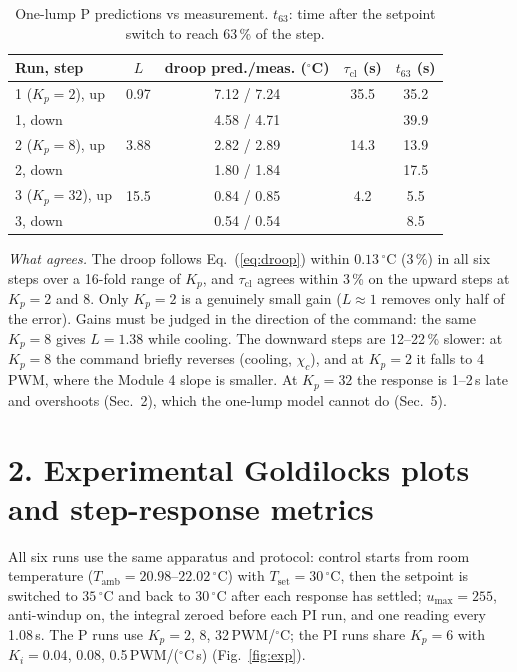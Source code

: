 \documentclass[reprint, amsmath, amssymb, aps, floatfix]{revtex4-2}
\newcommand{\degC}{\,^\circ\mathrm{C}}
\newcommand{\Tset}{T_{\mathrm{set}}}
\newcommand{\Tamb}{T_{\mathrm{amb}}}
\begin{document}
\begin{table}[h]
\caption{One-lump P predictions vs measurement. $t_{63}$: time after the setpoint switch
to reach 63\,\% of the step.}
\label{tab:p}
\begin{ruledtabular}
\begin{tabular}{lcccc}
Run, step & $L$ & droop pred./meas. ($^\circ$C) & $\tau_{\mathrm{cl}}$ (s) & $t_{63}$ (s) \\
\hline
1 ($K_p = 2$), up & 0.97 & 7.12 / 7.24 & 35.5 & 35.2 \\
1, down &  & 4.58 / 4.71 &  & 39.9 \\
2 ($K_p = 8$), up & 3.88 & 2.82 / 2.89 & 14.3 & 13.9 \\
2, down &  & 1.80 / 1.84 &  & 17.5 \\
3 ($K_p = 32$), up & 15.5 & 0.84 / 0.85 & 4.2 & 5.5 \\
3, down &  & 0.54 / 0.54 &  & 8.5 \\
\end{tabular}
\end{ruledtabular}
\end{table}

\emph{What agrees.} The droop follows Eq.~(\ref{eq:droop}) within $0.13\degC$ (3\,\%) in
all six steps over a 16-fold range of $K_p$, and $\tau_{\mathrm{cl}}$ agrees within 3\,\%
on the upward steps at $K_p = 2$ and 8. Only $K_p = 2$ is a genuinely small gain ($L \approx
1$ removes only half of the error). Gains must be judged in the direction of the command:
the same $K_p = 8$ gives $L = 1.38$ while cooling. The downward steps are 12--22\,\% slower: at $K_p = 8$ the
command briefly reverses (cooling, $\chi_c$), and at $K_p = 2$ it falls to 4 PWM, where the
Module 4 slope is smaller. At $K_p = 32$ the response is 1--2\,s late and
overshoots (Sec.~2), which the one-lump model cannot do (Sec.~5).

\section*{2. Experimental Goldilocks plots and step-response metrics}

All six runs use the same apparatus and protocol: control starts from room temperature
($\Tamb = 20.98$--$22.02\degC$) with $\Tset = 30\degC$, then the setpoint is switched to
$35\degC$ and back to $30\degC$ after each response has settled; $u_{\max} = 255$,
anti-windup on, the integral zeroed before each PI run, and one reading every 1.08\,s.
The P runs use $K_p = 2$, 8, 32\,PWM/$^\circ$C; the PI runs share $K_p = 6$ with
$K_i = 0.04$, 0.08, 0.5\,PWM/($^\circ$C\,s) (Fig.~\ref{fig:exp}).
\end{document}
